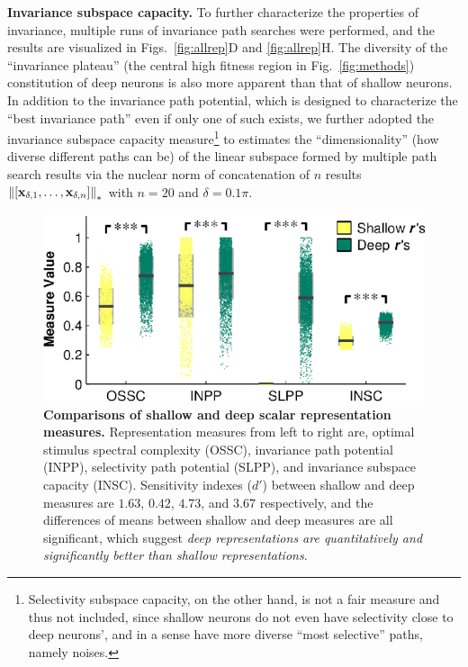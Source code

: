\documentclass[10pt,twocolumn,letterpaper]{article}
\begin{document}
\newcommand{\expnoslsc}{Selectivity subspace capacity, on the other hand, is not a fair measure and thus not included, since shallow neurons do not even have selectivity close to deep neurons', and in a sense have more diverse ``most selective'' paths, namely noises.}

{\bf Invariance subspace capacity.} To further characterize the properties of invariance, multiple runs of invariance path searches {were} performed, and the results are visualized in Figs.~\ref{fig:allrep}D and \ref{fig:allrep}H.
The diversity of the ``invariance plateau'' (\eg the central high fitness region in Fig.~\ref{fig:methods}) constitution of deep neurons is also more apparent than that of shallow neurons.
In addition to the invariance path potential, which is designed to characterize the ``best invariance path'' even if only one of such exists, we further adopted the invariance subspace capacity measure\footnote{\expnoslsc} to estimates the ``dimensionality'' (\ie how diverse different paths can be) of the linear subspace formed by multiple path search results via the nuclear norm of concatenation of $n$ results $\left\|\left[{\bf{x}}_{\delta,1},\dots,{\bf{x}}_{\delta,n}\right]\right\|_{*}$ with $n=20$ and $\delta=0.1\pi$.


\begin{figure}
\begin{center}
\includegraphics[width=0.80\columnwidth]{Figs/fig5.pdf} 
\end{center}
\caption{{\bf Comparisons of shallow and deep scalar representation measures.}
Representation measures from left to right are, optimal stimulus spectral complexity (OSSC), invariance path potential (INPP), selectivity path potential (SLPP), and invariance subspace capacity (INSC).
Sensitivity indexes ($d'$) between shallow and deep measures are $1.63$, $0.42$, $4.73$, and $3.67$ respectively, and the differences of means between shallow and deep measures are all significant\protect\footnotemark, which suggest \emph{deep representations are quantitatively and significantly better than shallow representations}.
} %
\label{fig:pair}
\end{figure}
\end{document}
